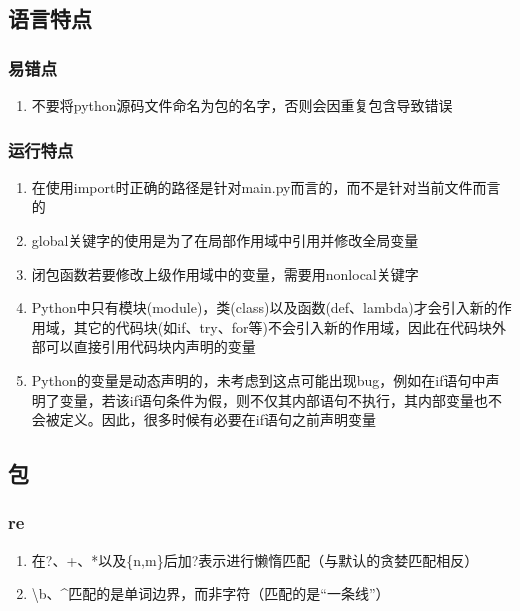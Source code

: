 \documentclass[onecolumn]{article}
\begin{document}
    \subsection{语言特点}
        \subsubsection{易错点}
            \noindent
            \begin{enumerate}
                \item 不要将python源码文件命名为包的名字，否则会因重复包含导致错误
            \end{enumerate}
        \subsubsection{运行特点}
            \noindent
            \begin{enumerate}
                \item 在使用import时正确的路径是针对main.py而言的，而不是针对当前文件而言的
                \item global关键字的使用是为了在局部作用域中引用并修改全局变量
                \item 闭包函数若要修改上级作用域中的变量，需要用nonlocal关键字
                \item Python中只有模块(module)，类(class)以及函数(def、lambda)才会引入新的作用域，其它的代码块(如if、try、for等)不会引入新的作用域，因此在代码块外部可以直接引用代码块内声明的变量
                \item Python的变量是动态声明的，未考虑到这点可能出现bug，例如在if语句中声明了变量，若该if语句条件为假，则不仅其内部语句不执行，其内部变量也不会被定义。因此，很多时候有必要在if语句之前声明变量
            \end{enumerate}
    \subsection{包}
        \subsubsection{re}
            \noindent
            \begin{enumerate}
                \item 在?、+、*以及\{n,m\}后加?表示进行懒惰匹配（与默认的贪婪匹配相反）
                \item \textbackslash b、\^{}匹配的是单词边界，而非字符（匹配的是“一条线”）
            \end{enumerate}
\end{document}
